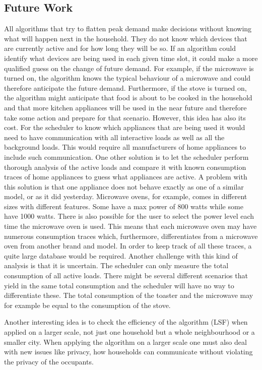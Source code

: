\subsection{Future Work}
All algorithms that try to flatten peak demand make decisions without knowing what will happen next in the household. They do not know which devices that are currently active and for how long they will be so. If an algorithm could identify what devices are being used in each given time slot, it could make a more qualified guess on the change of future demand. For example, if the microwave is turned on, the algorithm knows the typical behaviour of a microwave and could therefore anticipate the future demand. Furthermore, if the stove is turned on, the algorithm might anticipate that food is about to be cooked in the household and that more kitchen appliances will be used in the near future and therefore take some action and prepare for that scenario. However, this idea has also its cost. For the scheduler to know which appliances that are being used it would need to have communication with all interactive loads as well as all the background loads. This would require all manufacturers of home appliances to include such communication. One other solution is to let the scheduler perform thorough analysis of the active loads and compare it with known consumption traces of home appliances to guess what appliances are active. A problem with this solution is that one appliance does not behave exactly as one of a similar model, or as it did yesterday. Microwave ovens, for example, comes in different sizes with different features. Some have a max power of 800 watts while some have 1000 watts. There is also possible for the user to select the power level each time the microwave oven is used. This means that each microwave oven may have numerous consumption traces which, furthermore, differentiates from a microwave oven from another brand and model. In order to keep track of all these traces, a quite large database would be required. Another challenge with this kind of analysis is that it is uncertain. The scheduler can only measure the total consumption of all active loads. There might be several different scenarios that yield in the same total consumption and the scheduler will have no way to differentiate these. The total consumption of the toaster and the microwave may for example be equal to the consumption of the stove.

Another interesting idea is to check the efficiency of the algorithm (LSF) when applied on a larger scale, not just one household but a whole neighbourhood or a smaller city. When applying the algorithm on a larger scale one must also deal with new issues like privacy, how households can communicate without violating the privacy of the occupants.